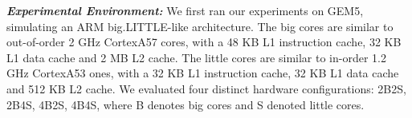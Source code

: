 
\textbf{\textit{Experimental Environment:}} We first ran our experiments on GEM5, simulating an ARM big.LITTLE-like architecture. The big cores are similar to out-of-order 2 GHz CortexA57 cores, with a 48 KB L1 instruction cache, 32 KB L1 data cache and 2 MB L2 cache. The little cores are similar to in-order 1.2 GHz CortexA53 ones, with a 32 KB L1 instruction cache, 32 KB L1 data cache and 512 KB L2 cache. We evaluated four distinct hardware configurations: 2B2S, 2B4S, 4B2S, 4B4S, where B denotes big cores and S denoted little cores.

